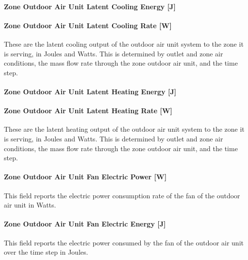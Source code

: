 \paragraph{Zone Outdoor Air Unit Latent Cooling Energy {[}J{]}}\label{zone-outdoor-air-unit-latent-cooling-energy-j}

\paragraph{Zone Outdoor Air Unit Latent Cooling Rate {[}W{]}}\label{zone-outdoor-air-unit-latent-cooling-rate-w}

These are the latent cooling output of the outdoor air unit system to the zone it is serving, in Joules and Watts. This is determined by outlet and zone air conditions, the mass flow rate through the zone outdoor air unit, and the time step.

\paragraph{Zone Outdoor Air Unit Latent Heating Energy {[}J{]}}\label{zone-outdoor-air-unit-latent-heating-energy-j}

\paragraph{Zone Outdoor Air Unit Latent Heating Rate {[}W{]}}\label{zone-outdoor-air-unit-latent-heating-rate-w}

These are the latent heating output of the outdoor air unit system to the zone it is serving, in Joules and Watts. This is determined by outlet and zone air conditions, the mass flow rate through the zone outdoor air unit, and the time step.

\paragraph{Zone Outdoor Air Unit Fan Electric Power {[}W{]}}\label{zone-outdoor-air-unit-fan-electric-power-w}

This field reports the electric power consumption rate of the fan of the outdoor air unit in Watts.

\paragraph{Zone Outdoor Air Unit Fan Electric Energy {[}J{]}}\label{zone-outdoor-air-unit-fan-electric-energy-j}

This field reports the electric power consumed by the fan of the outdoor air unit over the time step in Joules.

